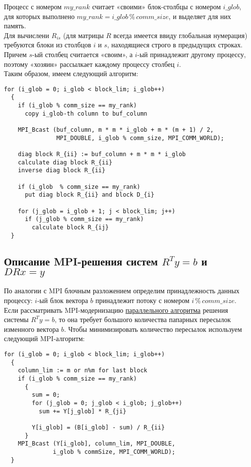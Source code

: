 \documentclass[a4paper,12pt]{article}
\begin{document}
    Процесс с номером $my\_rank$ считает «своими» блок-столбцы с номером $i\_glob$, 
    для которых выполнено $my\_rank = i\_glob \,\%\, comm\_size$,
    и выделяет для них память.\\

    Для вычислени $R_{is}$ (для матрицы $R$ всегда имеется ввиду глобальная нумерация) требуются блоки из столбцов $i$ и $s$, находящиеся строго в предыдущих строках. Причем $s$-ый столбец считается «своим», а $i$-ый принадлежит 
    другому процессу, поэтому «хозяин» рассылкает каждому процессу столбец $i$. \\
    
    Таким образом, имеем 
    \hypertarget{mpi_alg}{следующий алгоритм}: 

\begin{verbatim}
for (i_glob = 0; i_glob < block_lim; i_glob++)
  {
    if (i_glob % comm_size == my_rank)
      copy i_glob-th column to buf_column
    
    MPI_Bcast (buf_column, m * m * i_glob + m * (m + 1) / 2, 
               MPI_DOUBLE, i_glob % comm_size, MPI_COMM_WORLD);

    diag block R_{ii} := buf_column + m * m * i_glob
    calculate diag block R_{ii}
    inverse diag block R_{ii}
    
    if (i_glob  % comm_size == my_rank)
      put diag block R_{ii} and block D_{i}
        
    for (j_glob = i_glob + 1; j < block_lim; j++)
      if (j_glob % comm_size == my_rank)
        calculate block R_{ij}
  }
\end{verbatim}


\newpage
\subsection{Описание MPI-решения систем $R^T y = b$ и $DRx = y$}

    По аналогии с MPI блочным разложением определим принадлежность данных процессу:
    $i$-ый блок вектора $b$ принадлежит потоку с номером $i\,\%\, comm\_size$. \\
    
    Если рассматривать MPI-модернизацию 
    \hyperlink{th_calc_y}{параллельного алгоритма} решения системы $R^T y = b$, 
    то она требует большого количества папарных пересылок изменного вектора $b$.
    Чтобы минимизировать количество пересылок используем следующий MPI-алгоритм: 
    
\begin{verbatim}
for (i_glob = 0; i_glob < block_lim; i_glob++)
  {
    column_lim := m or n%m for last block
    if (i_glob % comm_size == my_rank)
      {
        sum = 0;
        for (j_glob = 0; j_glob < i_glob; j_glob++)
          sum += Y[j_glob] * R_{ji}
          
        Y[i_glob] = (B[i_glob] - sum) / R_{ii}
      }
    MPI_Bcast (Y[i_glob], column_lim, MPI_DOUBLE, 
              i_glob % commSize, MPI_COMM_WORLD);
  }
\end{verbatim}
\end{document}

